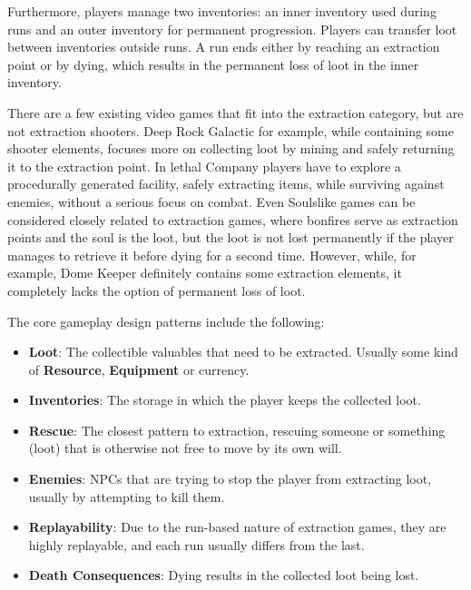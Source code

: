 Furthermore, players manage two inventories: an inner inventory used during runs and an outer inventory for permanent progression. Players can transfer loot between inventories outside runs. A run ends either by reaching an extraction point or by dying, which results in the permanent loss of loot in the inner inventory.

There are a few existing video games that fit into the extraction category, but are not extraction shooters. Deep Rock Galactic\cite{deepRockGalactic2018} for example, while containing some shooter elements, focuses more on collecting loot by mining and safely returning it to the extraction point. In lethal Company\cite{lethalCompany2023} players have to explore a procedurally generated facility, safely extracting items, while surviving against enemies, without a serious focus on combat. Even Soulslike games can be considered closely related to extraction games, where bonfires serve as extraction points and the soul is the loot, but the loot is not lost permanently if the player manages to retrieve it before dying for a second time. However, while, for example, Dome Keeper\cite{domeKeeper2022} definitely contains some extraction elements, it completely lacks the option of permanent loss of loot.

The core gameplay design patterns include the following:

\begin{itemize}
    \item \textbf{Loot}: The collectible valuables that need to be extracted. Usually some kind of \textbf{Resource}, \textbf{Equipment} or currency.
    \item \textbf{Inventories}: The storage in which the player keeps the collected loot.
    \item \textbf{Rescue}: The closest pattern to extraction, rescuing someone or something (loot) that is otherwise not free to move by its own will.
    \item \textbf{Enemies}: NPCs that are trying to stop the player from extracting loot, usually by attempting to kill them.
    \item \textbf{Replayability}: Due to the run-based nature of extraction games, they are highly replayable, and each run usually differs from the last.
    \item \textbf{Death Consequences}: Dying results in the collected loot being lost.
\end{itemize}



